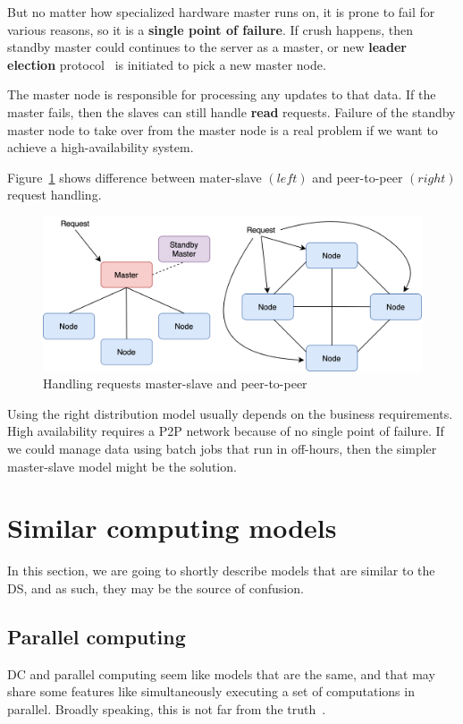 But no matter how specialized hardware master runs on, it is prone to fail for various reasons, so it is a \textbf{single point of failure}. If crush happens, then standby master could continues to the server as a master, or new \textbf{leader election} protocol~\cite{KorachKM90} is initiated to pick a new master node. 

The master node is responsible for processing any updates to that data. If the master fails, then the slaves can still handle \textbf{read} requests. Failure of the standby master node to take over from the master node is a real problem if we want to achieve a high-availability system.

Figure~\ref{fig:fig16} shows difference between mater-slave $(left)$ and peer-to-peer $(right)$ request handling.

\begin{figure}[H]
	\begin{center}
		\includegraphics[scale=0.7]{images/Figure16.png}
	\end{center}
	\vspace{-0.6cm}
	\caption{Handling requests master-slave and peer-to-peer}
	\label{fig:fig16}
\end{figure}

\noindent
Using the right distribution model usually depends on the business requirements. High availability requires a P2P network because of no single point of failure. If we could manage data using batch jobs that run in off-hours, then the simpler master-slave model might be the solution.
%
%
\section{Similar computing models}\label{sec:similar_models}
%
In this section, we are going to shortly describe models that are similar to the DS, and as such, they may be the source of confusion.
%
%
\subsection{Parallel computing}\label{sec:parallel_computing}
%
DC and parallel computing seem like models that are the same, and that may share some features like simultaneously executing a set of computations in parallel. Broadly speaking, this is not far from the truth~\cite{Vera16}. 

